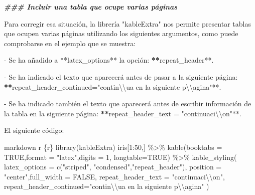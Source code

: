 \documentclass[11pt,a4paper,oneside,]{article}
\newenvironment{Shaded}{\begin{snugshade}}{\end{snugshade}}
\newcommand{\AttributeTok}[1]{\textcolor[rgb]{0.77,0.63,0.00}{#1}}
\newcommand{\DocumentationTok}[1]{\textcolor[rgb]{0.56,0.35,0.01}{\textbf{\textit{#1}}}}
\newcommand{\ErrorTok}[1]{\textcolor[rgb]{0.64,0.00,0.00}{\textbf{#1}}}
\newcommand{\NormalTok}[1]{#1}
\newcommand{\SpecialCharTok}[1]{\textcolor[rgb]{0.00,0.00,0.00}{#1}}
\newcommand{\StringTok}[1]{\textcolor[rgb]{0.31,0.60,0.02}{#1}}
\numberwithin{dummy}{section}
\theoremstyle{ocrenumbox}
\theoremstyle{blacknumex}
\theoremstyle{blacknumbox}
\theoremstyle{ocrenum}
\theoremstyle{ocrenum}
\begin{document}
\begin{Shaded}
\begin{Highlighting}[numbers=left,,]
\DocumentationTok{\#\#\# Incluir una tabla que ocupe varias páginas}

\NormalTok{Para corregir esa situación, la librería }\StringTok{"kableExtra"}\NormalTok{ nos permite presentar tablas que ocupen varias páginas utilizando los siguientes argumentos, como puede comprobarse en el ejemplo que se muestra}\SpecialCharTok{:}

\SpecialCharTok{{-}}\NormalTok{ Se ha añadido a }\SpecialCharTok{**}\NormalTok{latex\_options}\SpecialCharTok{**}\NormalTok{ la opción}\SpecialCharTok{:} \ErrorTok{**}\NormalTok{repeat\_header}\SpecialCharTok{**}\NormalTok{.}

\SpecialCharTok{{-}}\NormalTok{ Se ha indicado el texto que aparecerá antes de pasar a la siguiente página}\SpecialCharTok{:}
\ErrorTok{**}\StringTok{\textasciigrave{}}\AttributeTok{repeat\_header\_continued="contin}\SpecialCharTok{\textbackslash{}\textbackslash{}}\AttributeTok{\textquotesingle{}ua en la siguiente p}\SpecialCharTok{\textbackslash{}\textbackslash{}}\AttributeTok{\textquotesingle{}agina"}\StringTok{\textasciigrave{}}\SpecialCharTok{**}\NormalTok{.}

\SpecialCharTok{{-}}\NormalTok{ Se ha indicado también el texto que aparecerá antes de escribir información de la tabla en la siguiente página}\SpecialCharTok{:} \ErrorTok{**}\StringTok{\textasciigrave{}}\AttributeTok{repeat\_header\_text = "continuaci}\SpecialCharTok{\textbackslash{}\textbackslash{}}\AttributeTok{\textquotesingle{}on"}\StringTok{\textasciigrave{}}\SpecialCharTok{**}\NormalTok{.}

\NormalTok{El siguiente código}\SpecialCharTok{:}

\StringTok{\textasciigrave{}\textasciigrave{}\textasciigrave{}\textasciigrave{}}\NormalTok{markdown}
\StringTok{\textasciigrave{}}\AttributeTok{r \textquotesingle{}\textquotesingle{}}\StringTok{\textasciigrave{}\textasciigrave{}\textasciigrave{}\textasciigrave{}}\AttributeTok{\{r\}}
\AttributeTok{library(kableExtra) }
\AttributeTok{iris[1:50,] \%\textgreater{}\% }
\AttributeTok{  kable(booktabs = TRUE,format = "latex",digits = 1, longtable=TRUE) \%\textgreater{}\%}
\AttributeTok{  kable\_styling(}
\AttributeTok{   latex\_options = c("striped", "condensed","repeat\_header"), }
\AttributeTok{   position = "center",full\_width = FALSE,}
\AttributeTok{   repeat\_header\_text = "continuaci}\SpecialCharTok{\textbackslash{}\textbackslash{}}\AttributeTok{\textquotesingle{}on", }
\AttributeTok{   repeat\_header\_continued="contin}\SpecialCharTok{\textbackslash{}\textbackslash{}}\AttributeTok{\textquotesingle{}ua en la siguiente p}\SpecialCharTok{\textbackslash{}\textbackslash{}}\AttributeTok{\textquotesingle{}agina"}
\AttributeTok{  )}
\StringTok{\textasciigrave{}\textasciigrave{}\textasciigrave{}}
\StringTok{\textasciigrave{}\textasciigrave{}\textasciigrave{}\textasciigrave{}}


\end{Highlighting}
\end{Shaded}
\end{document}
